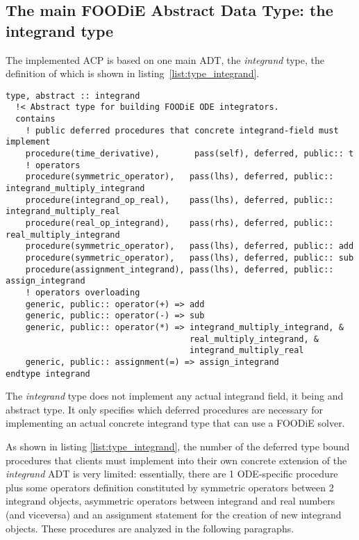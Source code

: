 \subsection{The main FOODiE Abstract Data Type: the integrand type}\label{subsec:type_integrand}

The implemented ACP is based on one main ADT, the \emph{integrand} type, the definition of which is shown in listing~\ref{list:type_integrand}.

\begin{lstlisting}[firstnumber=1,style=code,caption={integrand type definition},label={list:type_integrand}]
type, abstract :: integrand
  !< Abstract type for building FOODiE ODE integrators.
  contains
    ! public deferred procedures that concrete integrand-field must implement
    procedure(time_derivative),       pass(self), deferred, public:: t
    ! operators
    procedure(symmetric_operator),   pass(lhs), deferred, public:: integrand_multiply_integrand
    procedure(integrand_op_real),    pass(lhs), deferred, public:: integrand_multiply_real
    procedure(real_op_integrand),    pass(rhs), deferred, public:: real_multiply_integrand
    procedure(symmetric_operator),   pass(lhs), deferred, public:: add
    procedure(symmetric_operator),   pass(lhs), deferred, public:: sub
    procedure(assignment_integrand), pass(lhs), deferred, public:: assign_integrand
    ! operators overloading
    generic, public:: operator(+) => add
    generic, public:: operator(-) => sub
    generic, public:: operator(*) => integrand_multiply_integrand, &
                                     real_multiply_integrand, &
                                     integrand_multiply_real
    generic, public:: assignment(=) => assign_integrand
endtype integrand
\end{lstlisting}

The \emph{integrand} type does not implement any actual integrand field, it being and abstract type. It only specifies which deferred procedures are necessary for implementing an actual concrete integrand type that can use a FOODiE solver.

As shown in listing \ref{list:type_integrand}, the number of the deferred type bound procedures that clients must implement into their own concrete extension of the \emph{integrand} ADT is very limited: essentially, there are 1 ODE-specific procedure plus some operators definition constituted by symmetric operators between 2 integrand objects, asymmetric operators between integrand and real numbers (and viceversa) and an assignment statement for the creation of new integrand objects. These procedures are analyzed in the following paragraphs.

